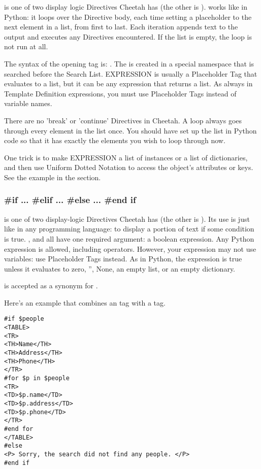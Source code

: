 { is one of two display logic Directives Cheetah has (the other is
).   works like in Python: it loops over the Directive
body, each time setting a placeholder to the next element in a list, from first
to last.  Each iteration appends text to the output and executes any
Directives encountered.  If the list is empty, the loop is not run at all.

The syntax of the opening tag is: .  The  is created in a special namespace
that is searched before the Search List.  EXPRESSION is usually a 
Placeholder Tag that evaluates to a list, but it can be any expression that
returns a list.  As always in Template Definition expressions, you must use
Placeholder Tags instead of variable names.

There are no 'break' or 'continue' Directives in Cheetah.  A  loop
always goes through every element in the list once.  You should have set up the
list in Python code so that it has exactly the elements you wish to loop through
now.

One trick is to make EXPRESSION a list of instances or a list of dictionaries,
and then use Uniform Dotted Notation to access the object's attributes or keys.
See the example in the  section.

\subsubsection{\#if ... \#elif ... \#else ... \#end if}

 is one of two display-logic Directives Cheetah has (the other is
).  Its use is just like in any programming language: to display
a portion of text if some condition is true.  
,  and  all have one required argument:
a boolean expression.  Any Python expression is allowed, including operators.
However, your expression may not use variables:  use Placeholder Tags instead.
As in Python, the expression is true unless it evaluates to zero, '', None, an
empty list, or an empty dictionary.

 is accepted as a synonym for {\elif}.

Here's an example that combines an  tag with a  tag.

\begin{verbatim}
#if $people
<TABLE>
<TR>
<TH>Name</TH>
<TH>Address</TH>
<TH>Phone</TH>
</TR>
#for $p in $people
<TR>
<TD>$p.name</TD>
<TD>$p.address</TD>
<TD>$p.phone</TD>
</TR>
#end for
</TABLE>
#else
<P> Sorry, the search did not find any people. </P>
#end if
\end{verbatim}



}
